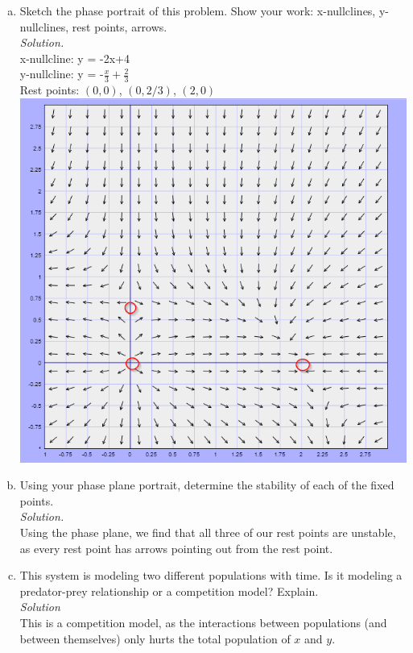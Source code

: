 \documentclass[12pt,letterpaper]{article}
\begin{document}
\begin{enumerate}
\begin{enumerate}[a)]
\item Sketch the phase portrait of this problem. Show your work: x-nullclines, y-nullclines, rest points, arrows.
\\\emph{Solution.} \\
x-nullcline: y = -2x+4\\
y-nullcline: y = -$\frac{x}{3} + \frac{2}{3}$\\
Rest points: $(0, 0)$, $(0, 2/3)$, $(2, 0)$\\
\includegraphics[scale = .5]{number5b.png}\\

\item Using your phase plane portrait, determine the stability of each of the fixed points.
\\\emph{Solution.}\\
Using the phase plane, we find that all three of our rest points are unstable, as 
every rest point has arrows pointing out from the rest point.

\item  This system is modeling two different populations with time. Is it modeling a  predator-prey relationship or a competition model? Explain.
\\ \emph{Solution}\\
This is a competition model, as the interactions between populations (and between themselves)
only hurts the total population of $x$ and $y$. 


\end{enumerate}
\end{enumerate}
\end{document}
